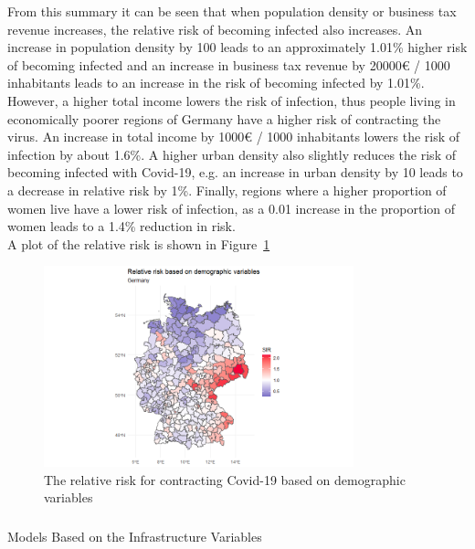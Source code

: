 From this summary it can be seen that when population density or business tax revenue increases, the relative risk of becoming infected also increases. An increase in population density by 100 leads to an approximately 1.01\% higher risk of becoming infected and an increase in business tax revenue by 20000€ / 1000 inhabitants leads to an increase in the risk of becoming infected by 1.01\%. \\
However, a higher total income lowers the risk of infection, thus people living in economically poorer regions of Germany have a higher risk of contracting the virus. An increase in total income by 1000€ / 1000 inhabitants lowers the risk of infection by about 1.6\%. A higher urban density also slightly reduces the risk of becoming infected with Covid-19, e.g. an increase in urban density by 10 leads to a decrease in relative risk by 1\%. Finally, regions where a higher proportion of women live have a lower risk of infection, as a 0.01 increase in the proportion of women leads to a 1.4\% reduction in risk. \\
A plot of the relative risk is shown in Figure~\ref{relriskDemoGermany}
%     
\begin{figure}[H]
    \centering
    \includegraphics[width = 0.8\textwidth]{tex_files/demo_germany.png}
    \caption{The relative risk for contracting Covid-19 based on demographic variables}
    \label{relriskDemoGermany}
\end{figure}
\subsubsection{}{Models Based on the Infrastructure Variables}

